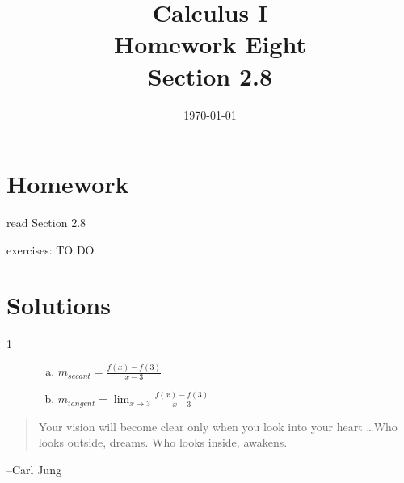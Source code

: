 \documentclass[letterpaper, landscape]{exam}
\title{Calculus I \\ Homework Eight \\ Section 2.8}
\author{}
\date{\today}
\begin{document}
  \maketitle

  \section{Homework}
    \begin{itemize*}
      \item read Section 2.8
      \item exercises: TO DO
    \end{itemize*}

  \ifprintanswers

  \section{Solutions}

    \begin{description}

      \item[1] 
        \begin{enumerate}[(a)]

          \item $m_{secant} = \frac{f(x) - f(3)}{x - 3}$ 

          \item $m_{tangent} = \lim_{x \to 3} \frac{f(x) - f(3)}{x - 3}$ 

        \end{enumerate}

     \end{description}
 
 
  \else
    \vspace{10 cm}
    \begin{quote}
      \begin{em}
        Your vision will become clear only when you look into your heart \dots Who looks
        outside, dreams. Who looks inside, awakens.
      \end{em}
    \end{quote}
    \hspace{2 cm} --Carl Jung
  \fi
\end{document}
